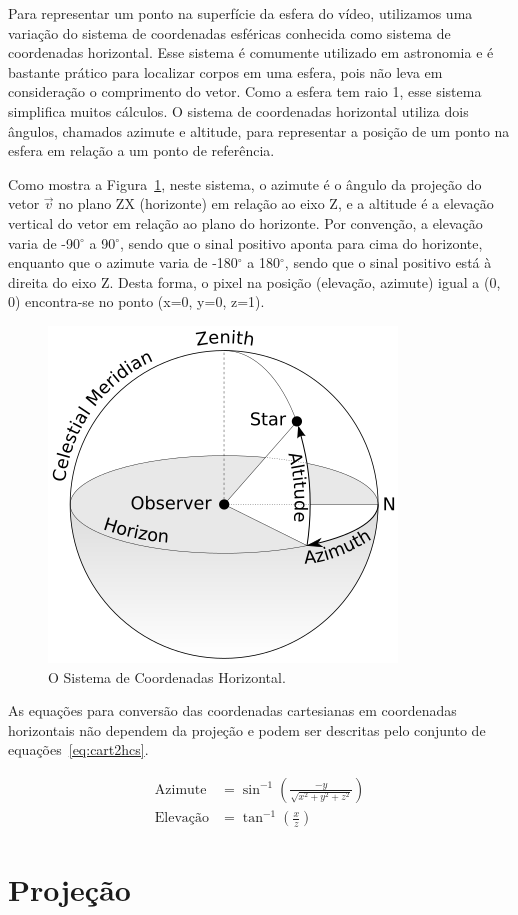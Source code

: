Para representar um ponto na superfície da esfera do vídeo, utilizamos uma variação do sistema de coordenadas esféricas conhecida como sistema de coordenadas horizontal. Esse sistema é comumente utilizado em astronomia e é bastante prático para localizar corpos em uma esfera, pois não leva em consideração o comprimento do vetor. Como a esfera tem raio 1, esse sistema simplifica muitos cálculos. O sistema de coordenadas horizontal utiliza dois ângulos, chamados azimute e altitude, para representar a posição de um ponto na esfera em relação a um ponto de referência.

Como mostra a Figura~\ref{fig:hcs}, neste sistema, o azimute é o ângulo da projeção do vetor $\overrightarrow{v}$ no plano ZX (horizonte) em relação ao eixo Z, e a altitude é a elevação vertical do vetor em relação ao plano do horizonte. Por convenção, a elevação varia de -90$^\circ$ a 90$^\circ$, sendo que o sinal positivo aponta para cima do horizonte, enquanto que o azimute varia de -180$^\circ$ a 180$^\circ$, sendo que o sinal positivo está à direita do eixo Z. Desta forma, o pixel na posição (elevação, azimute) igual a (0, 0) encontra-se no ponto (x=0, y=0, z=1).

\begin{figure}[h]
	\centering
	\includegraphics[width=0.30\linewidth]{fig/hcs.png}
	\caption{O Sistema de Coordenadas Horizontal.}
	\label{fig:hcs}
\end{figure}

As equações para conversão das coordenadas cartesianas em coordenadas horizontais não dependem da projeção e podem ser descritas pelo conjunto de equações~\ref{eq:cart2hcs}.

\begin{equation}
\label{eq:cart2hcs}
\begin{split}
	\text{Azimute} &=\sin^{-1}\left(\frac{-y}{\sqrt{x^2+y^2+z^2}}\right) \\
	\text{Elevação} &=\tan^{-1}\left(\frac{x}{z}\right)
\end{split}
\end{equation}


\section{Projeção}


